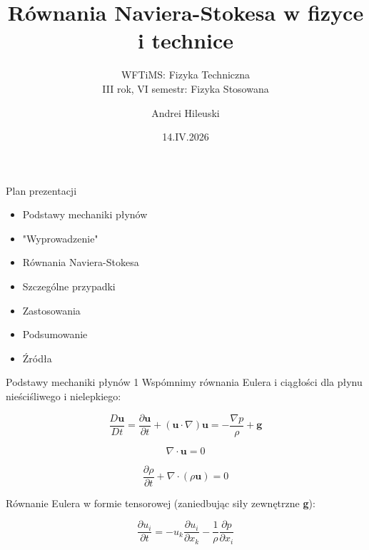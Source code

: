 \documentclass{beamer}
\title[Równania Naviera-Stokesa w fizyce i technice]{Równania Naviera-Stokesa w fizyce i technice}
\subtitle{WFTiMS: Fizyka Techniczna\\ III rok, VI semestr: Fizyka Stosowana}
\author{Andrei Hileuski}
\date{14.IV.2026}
\begin{document}
\pgtitleframe



\begin{frame}{Plan prezentacji}
	\begin{itemize}
		\item Podstawy mechaniki płynów
		\item "Wyprowadzenie"
		\item Równania Naviera-Stokesa
		\item Szczególne przypadki
		\item Zastosowania
		\item Podsumowanie
		\item Źródła
	\end{itemize}
\end{frame}

\begin{frame}{Podstawy mechaniki płynów 1}
	Wspómnimy równania Eulera i ciągłości dla płynu nieściśliwego i nielepkiego:


	\begin{equation}
		\frac{D\textbf{u}}{Dt} = \frac{\partial \textbf{u}}{\partial t} + (\textbf{u} \cdot \nabla) \textbf{u} = -\frac{\nabla p}{\rho} + \textbf{g}
		\label{eq:euler0}
	\end{equation}

	
	\begin{equation}
		\nabla \cdot \textbf{u} = 0
		\label{eq:incompressibility}
	\end{equation}


	
	\begin{equation}
		\frac{\partial \rho}{\partial t} +
		\nabla \cdot (\rho \textbf{u}) = 0
		\label{eq:continuity}
	\end{equation}
	

	Równanie Eulera w formie tensorowej (zaniedbując siły zewnętrzne \textbf{g}):

	\begin{equation}
		\frac{\partial u_i}{\partial t} = -u_k \frac{\partial u_i}{\partial x_k}
		-\frac{1}{\rho} \frac{\partial p}{\partial x_i}
		\label{eq:euler_tensor}
	\end{equation}

\end{frame}
\end{document}

